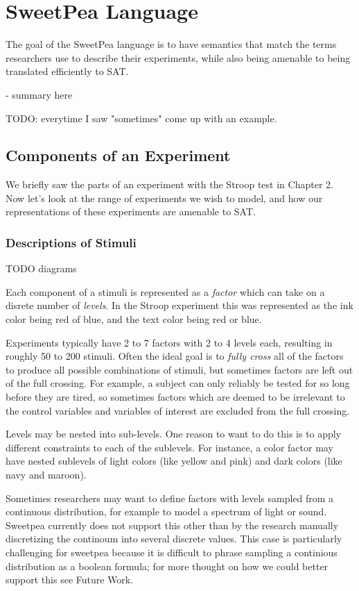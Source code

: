 
\chapter{SweetPea Language}

The goal of the SweetPea language is to have semantics that match the terms researchers use to describe their experiments, while also being amenable to being translated efficiently to SAT.

- summary here

TODO: everytime I saw "sometimes" come up with an example.

\section{Components of an Experiment}

We briefly saw the parts of an experiment with the Stroop test in Chapter 2. Now let's look at the range of experiments we wish to model, and how our representations of these experiments are amenable to SAT.

\subsection{Descriptions of Stimuli}

TODO diagrams

Each component of a stimuli is represented as a \emph{factor} which can take on a disrete number of \emph{levels}. In the Stroop experiment this was represented as the ink color being red of blue, and the text color being red or blue.

Experiments typically have 2 to 7 factors with 2 to 4 levels each, resulting in roughly 50 to 200 stimuli. Often the ideal goal is to \emph{fully cross} all of the factors to produce all possible combinations of stimuli, but sometimes factors are left out of the full crossing. For example, a subject can only reliably be tested for so long before they are tired, so sometimes factors which are deemed to be irrelevant to the control variables and variables of interest are excluded from the full crossing.

Levels may be nested into sub-levels. One reason to want to do this is to apply different constraints to each of the sublevels. For instance, a color factor may have nested sublevels of light colors (like yellow and pink) and dark colors (like navy and maroon).

Sometimes researchers may want to define factors with levels sampled from a continuous distribution, for example to model a spectrum of light or sound. Sweetpea currently does not support this other than by the research manually discretizing the continoum into several discrete values. This case is particularly challenging for sweetpea because it is difficult to phrase sampling a continious distribution as a boolean formula; for more thought on how we could better support this see Future Work.

